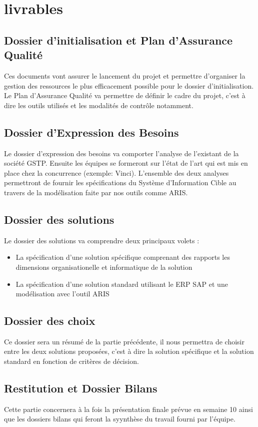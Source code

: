 \section{livrables}

\subsection{Dossier d'initialisation et Plan d'Assurance Qualité}

Ces documents vont assurer le lancement du projet et permettre d'organiser la gestion des ressources le plus efficacement possible pour le dossier d'initialisation.
Le Plan d'Assurance Qualité va permettre de définir le cadre du projet, c'est à dire les outils utilisés et les modalités de contrôle notamment. 

\subsection{Dossier d'Expression des Besoins}

Le dossier d'expression des besoins va comporter l'analyse de l'existant de la société GSTP. Ensuite les équipes se formeront sur l'état de l'art qui est mis en place chez la concurrence (exemple: Vinci). L'ensemble des deux analyses permettront de fournir les spécifications du Système d'Information Cible au travers de la modélisation faite par nos outils comme ARIS. 

\subsection{Dossier des solutions}

Le dossier des solutions va comprendre deux principaux volets :
\begin{itemize}
\item La spécification d'une solution spécifique comprenant des rapports les dimensions organisationelle et informatique de la solution
\item La spécification d'une solution standard utilisant le ERP SAP et une modélisation avec l'outil ARIS
\end{itemize}

\subsection{Dossier des choix}

Ce dossier sera un résumé de la partie précédente, il nous permettra de choisir entre les deux solutions proposées, c'est à dire la solution spécifique et la solution standard en fonction de critères de décision. 

\subsection{Restitution et Dossier Bilans}

Cette partie concernera à la fois la présentation finale prévue en semaine 10 ainsi que les dossiers bilans qui feront la syynthèse du travail fourni par l'équipe.
